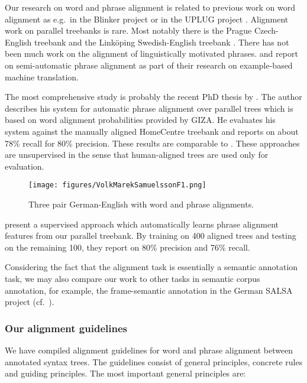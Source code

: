 \documentclass[output=paper]{LSP/langsci}
\begin{document}
Our research on word and phrase alignment is related to previous work on word alignment as e.g.~in the Blinker project \citep{Melamed1998} or in the UPLUG project \citep{AhrenbergEtAl2003}. Alignment work on parallel treebanks is rare. Most notably there is the Prague Czech-English treebank \citep{Kruijff-KorbayováEtAl2006} and the Linköping Swedish-English treebank \citep{Ahrenberg2007}. There has not been much work on the alignment of linguistically motivated phrases. \citet{TinsleyEtAl2007} and \citet{GrovesEtAl2004} report on semi-automatic phrase alignment as part of their research on example-based machine translation. 

The most comprehensive study is probably the recent PhD thesis by \citet{Zhechev2009}. The author describes his system for automatic phrase alignment over parallel trees which is based on word alignment probabilities provided by GIZA. He evaluates his system against the manually aligned HomeCentre treebank and reports on about 78\% recall for 80\% precision. These results are comparable to \citet{Ambati2008}. These approaches are unsupervised in the sense that human-aligned trees are used only for evaluation. 

\begin{figure}
\texttt{[image: figures/VolkMarekSamuelssonF1.png]}
\caption{Three pair German-English with word and phrase alignments.}
\label{fig:volkmareksamuelsson:1}
\end{figure}

\citet{Tiedemann2009} present a supervised approach which automatically learns phrase alignment features from our parallel treebank. By training on 400 aligned trees and testing on the remaining 100, they report on 80\% precision and 76\% recall. 


Considering the fact that the alignment task is essentially a semantic annotation task, we may also compare our work to other tasks in semantic corpus annotation, for example, the frame-semantic annotation in the German SALSA project (cf.~\citealt{BurchardtEtAl2006}).

\subsubsection{Our alignment guidelines}\label{sec:volk:2.2.2}

We have compiled alignment guidelines for word and phrase alignment between annotated syntax trees. The guidelines consist of general principles, concrete rules and guiding principles. The most important general principles are: 
\end{document}
